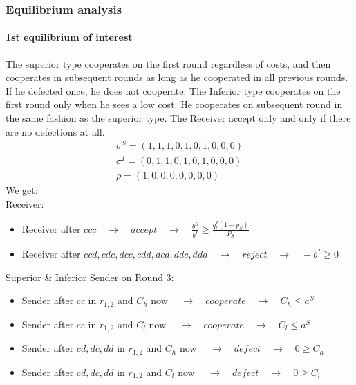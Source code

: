 \documentclass[11pt]{article}
\theoremstyle{plainCl1}
\begin{document}
\subsubsection{Equilibrium analysis}
\paragraph{1st equilibrium of interest}
The superior type cooperates on the first round regardless of costs, and then cooperates in subsequent rounds as long as he cooperated in all previous rounds. If he defected once, he does not cooperate. The Inferior type cooperates on the first round only when he sees a low cost. He cooperates on subsequent round in the same fashion as the superior type. The Receiver accept only and only if there are no defections at all.\\
	\begin{equation}\label{strategies}
	\begin{array}{l}	
	\sigma^S = (1, 1, 1, 0, 1, 0, 1, 0, 0, 0)\\
	\sigma^I = (0, 1, 1, 0, 1, 0, 1, 0, 0, 0)\\
	\rho = (1, 0, 0, 0, 0, 0, 0, 0)
	\end{array}
	\end{equation}
We get:\\	
Receiver:
\begin{itemize} [noitemsep]
	\item Receiver after $ccc \quad \rightarrow \quad accept \quad \rightarrow \quad \frac{b^S}{b^I}\geq \frac{q^I_l (1-p_S)}{P_S}$\\
	\item Receiver after $ccd, cdc, dcc, cdd, dcd, ddc, ddd \quad \rightarrow \quad reject \quad \rightarrow \quad -b^I \geq 0$\\
\end{itemize}
Superior \& Inferior Sender on Round 3:
\begin{itemize} [noitemsep]
	\item Sender after $cc$ in $r_{1,2}$ and $C_h$ now $\quad \rightarrow \quad cooperate \quad \rightarrow \quad C_h \leq a^S$\\
	\item Sender after $cc$ in $r_{1,2}$ and $C_l$ now $\quad \rightarrow \quad cooperate \quad \rightarrow \quad C_l \leq a^S$\\
	\item Sender after $cd, dc, dd$ in $r_{1,2}$ and $C_h$ now $\quad \rightarrow \quad defect \quad \rightarrow \quad 0 \geq C_h$\\
	\item Sender after $cd, dc, dd$ in $r_{1,2}$ and $C_l$ now $\quad \rightarrow \quad defect \quad \rightarrow \quad 0 \geq C_l$\\
\end{itemize}
\end{document}
